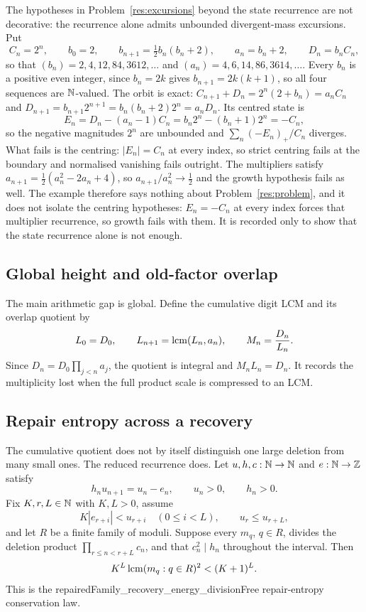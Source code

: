 \documentclass[11pt]{article}
\begin{document}
\begin{remark}
The hypotheses in Problem~\ref{res:excursions} beyond the state recurrence are
not decorative: the recurrence alone admits unbounded divergent-mass
excursions.  Put
\[
 C_n=2^{n},\qquad b_0=2,\qquad b_{n+1}=\tfrac12 b_n(b_n+2),\qquad
 a_n=b_n+2,\qquad D_n=b_nC_n ,
\]
so that $(b_n)=2,4,12,84,3612,\ldots$ and $(a_n)=4,6,14,86,3614,\ldots$.  Every
$b_n$ is a positive even integer, since $b_n=2k$ gives $b_{n+1}=2k(k+1)$, so all
four sequences are $\mathbb{N}$-valued.  The orbit is exact:
$C_{n+1}+D_n=2^{n}(2+b_n)=a_nC_n$ and
$D_{n+1}=b_{n+1}2^{n+1}=b_n(b_n+2)2^{n}=a_nD_n$.  Its centred state is
\[
 E_n=D_n-(a_n-1)C_n=b_n2^{n}-(b_n+1)2^{n}=-C_n ,
\]
so the negative magnitudes $2^{n}$ are unbounded and $\sum_n(-E_n)_+/C_n$
diverges.  What fails is the centring: $|E_n|=C_n$ at every index, so strict
centring fails at the boundary and normalised vanishing fails outright.  The
multipliers satisfy $a_{n+1}=\tfrac12(a_n^{2}-2a_n+4)$, so
$a_{n+1}/a_n^{2}\to\tfrac12$ and the growth hypothesis fails as well.  The
example therefore says nothing about Problem~\ref{res:problem}, and it does not
isolate the centring hypotheses: $E_n=-C_n$ at every index forces that
multiplier recurrence, so growth fails with them.  It is recorded only to show
that the state recurrence alone is not enough.
\end{remark}

\subsection{Global height and old-factor overlap}

The main arithmetic gap is global.  Define the cumulative digit LCM and its
overlap quotient by
\[
 L_0=D_0,\qquad L_{n+1}=\operatorname{lcm}(L_n,a_n),\qquad M_n=\frac{D_n}{L_n}.
\]
Since $D_n=D_0\prod_{j<n}a_j$, the quotient is integral and
$M_nL_n=D_n$.  It records the multiplicity lost when the full product scale
is compressed to an LCM.

\subsection{Repair entropy across a recovery}

The cumulative quotient does not by itself distinguish one large deletion
from many small ones.  The reduced recurrence does.  Let $u,h,c:\mathbb{N}\to\mathbb{N}$ and
$e:\mathbb{N}\to\mathbb{Z}$ satisfy
\[
 h_nu_{n+1}=u_n-e_n,
 \qquad u_n>0,
 \qquad h_n>0.
\]
Fix $K,r,L\in\mathbb{N}$ with $K,L>0$, assume
\[
 K|e_{r+i}|<u_{r+i}\quad(0\le i<L),
 \qquad u_r\le u_{r+L},
\]
and let $R$ be a finite family of moduli.  Suppose every $m_q$, $q\in R$,
divides the deletion product $\prod_{r\le n<r+L}c_n$, and that
$c_n^2\mid h_n$ throughout the interval.  Then
\begin{equation}\label{eq:repair-entropy}
 K^L\lcm(m_q:q\in R)^2<(K+1)^L.
\end{equation}
This is the
      {repairedFamily_recovery_energy_divisionFree}
      {repair-entropy conservation law}.
\end{document}
